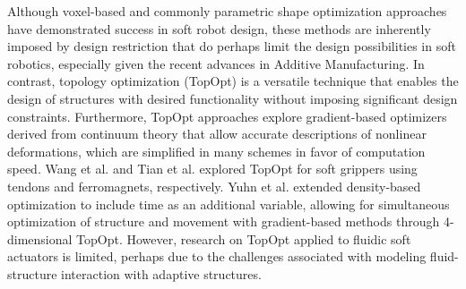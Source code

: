 Although voxel-based \cite{Kriegman2019,Cheney2013} and commonly parametric shape optimization \cite{Coevoet2017,Manns2018Jan,Morzadec2019Apr} approaches have demonstrated success in soft robot design, these methods are inherently imposed by design restriction that do perhaps limit the design possibilities in soft robotics, especially given the recent advances in Additive Manufacturing. In contrast, topology optimization \cite{Bendsoe2003,Gain2013Dec,Zhang2017Topo} (TopOpt) is a versatile technique that enables the design of structures with desired functionality without imposing significant design constraints. Furthermore, TopOpt approaches explore gradient-based optimizers derived from continuum theory that allow accurate descriptions of nonlinear deformations, which are simplified in many schemes in favor of computation speed. Wang et al. \cite{Wang2020Nov} and Tian et al. \cite{Tian2020May} explored TopOpt for soft grippers using tendons and ferromagnets, respectively. Yuhn et al. \cite{Yuhn2023Feb} extended density-based optimization to include time as an additional variable, allowing for simultaneous optimization of structure and movement with gradient-based methods through 4-dimensional TopOpt. However, research on TopOpt applied to fluidic soft actuators is limited, perhaps due to the challenges associated with modeling fluid-structure interaction with adaptive structures.

\vspace{-2mm}
